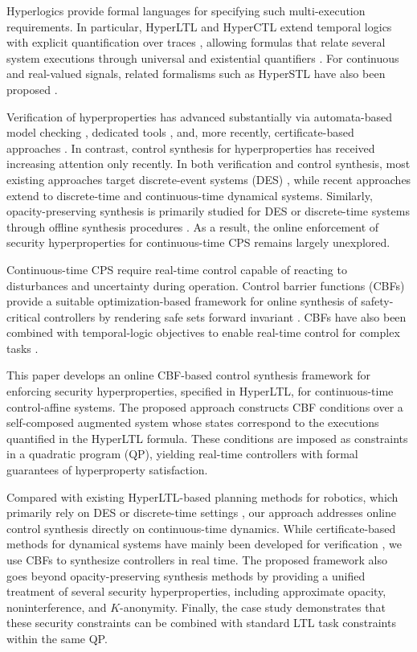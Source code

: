 \documentclass[journal,twoside,web]{ieeecolor}
\begin{document}
Hyperlogics provide formal languages for specifying such multi-execution requirements. In particular, HyperLTL and HyperCTL extend temporal logics with explicit quantification over traces \cite{clarkson2014}, allowing formulas that relate several system executions through universal and existential quantifiers \cite{finkbeiner2015}. For continuous and real-valued signals, related formalisms such as HyperSTL have also been proposed \cite{nguyen2017}. 

Verification of hyperproperties has advanced substantially via automata-based model checking \cite{clarkson2014}, dedicated tools \cite{finkbeiner2015}, and, more recently, certificate-based approaches \cite{anand2024}. In contrast, control synthesis for hyperproperties has received increasing attention only recently. In both verification and control synthesis, most existing approaches target discrete-event systems (DES) \cite{wang2020, finkbeiner2015}, while recent approaches extend to discrete-time \cite{anand2024, zhao2025} and continuous-time \cite{cui2026} dynamical systems. Similarly, opacity-preserving synthesis is primarily studied for DES \cite{yang2023, yu2022} or discrete-time systems through offline synthesis procedures \cite{zhong2025}. As a result, the online enforcement of security hyperproperties for continuous-time CPS remains largely unexplored.

Continuous-time CPS require real-time control capable of reacting to disturbances and uncertainty during operation. Control barrier functions (CBFs) provide a suitable optimization-based framework for online synthesis of safety-critical controllers by rendering safe sets forward invariant \cite{ames2014, ames2019}. CBFs have also been combined with temporal-logic objectives to enable real-time control for complex tasks \cite{lindemann2019, srinivasan2021}.

This paper develops an online CBF-based control synthesis framework for enforcing security hyperproperties, specified in HyperLTL, for continuous-time control-affine systems. The proposed approach constructs CBF conditions over a self-composed augmented system whose states correspond to the executions quantified in the HyperLTL formula. These conditions are imposed as constraints in a quadratic program (QP), yielding real-time controllers with formal guarantees of hyperproperty satisfaction. 

Compared with existing HyperLTL-based planning methods for robotics, which primarily rely on DES \cite{wang2020, bonakdarpour2022} or discrete-time settings \cite{zhao2025}, our approach addresses online control synthesis directly on continuous-time dynamics. While certificate-based methods for dynamical systems have mainly been developed for verification \cite{anand2024, cui2026}, we use CBFs to synthesize controllers in real time. The proposed framework also goes beyond opacity-preserving synthesis methods \cite{yang2023, yu2022, zhong2025} by providing a unified treatment of several security hyperproperties, including approximate opacity, noninterference, and $K$-anonymity. Finally, the case study demonstrates that these security constraints can be combined with standard LTL task constraints within the same QP.
\end{document}
